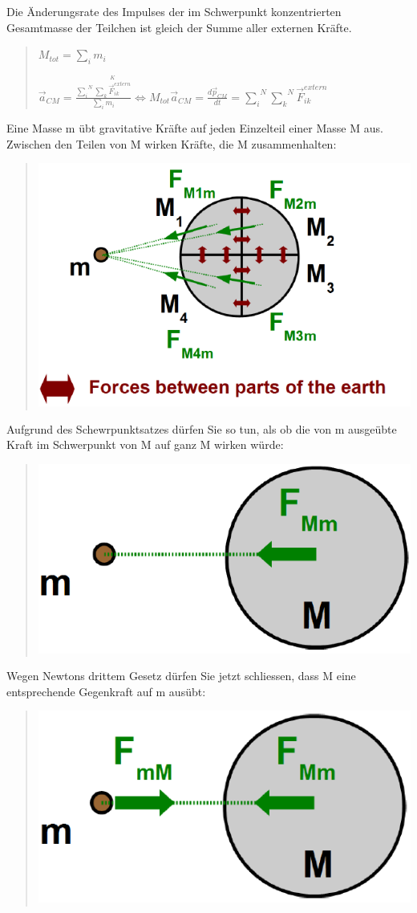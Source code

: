 Die Änderungsrate des Impulses der im Schwerpunkt konzentrierten Gesamtmasse
der Teilchen ist gleich der Summe aller externen Kräfte.
\begin{verse}
$M_{tot}=\underset{i}{\sum}m_{i}$

$\vec{a}_{CM}=\frac{\overset{N}{\underset{i}{\sum}}\overset{K}{\underset{k}{\sum}\vec{F}_{ik}^{extern}}}{\underset{i}{\sum}m_{i}}\Longleftrightarrow M_{tot}\vec{a}_{CM}=\frac{d\vec{p}_{CM}}{dt}=\overset{N}{\underset{i}{\sum}}\overset{N}{\underset{k}{\sum}}\vec{F}_{ik}^{extern}$
\end{verse}
Eine Masse m übt gravitative Kräfte auf jeden Einzelteil einer Masse
M aus. Zwischen den Teilen von M wirken Kräfte, die M zusammenhalten:
\begin{verse}
\includegraphics[scale=0.4]{Impuls/Schwerpunktsatz1}
\end{verse}
Aufgrund des Schewrpunktsatzes dürfen Sie so tun, als ob die von m
ausgeübte Kraft im Schwerpunkt von M auf ganz M wirken würde:
\begin{verse}
\includegraphics[scale=0.4]{Impuls/Schwerpunktsatz2}
\end{verse}
Wegen Newtons drittem Gesetz dürfen Sie jetzt schliessen, dass M eine
entsprechende Gegenkraft auf m ausübt:
\begin{verse}
\includegraphics[scale=0.4]{Impuls/Schwerpunktsatz3}\end{verse}

